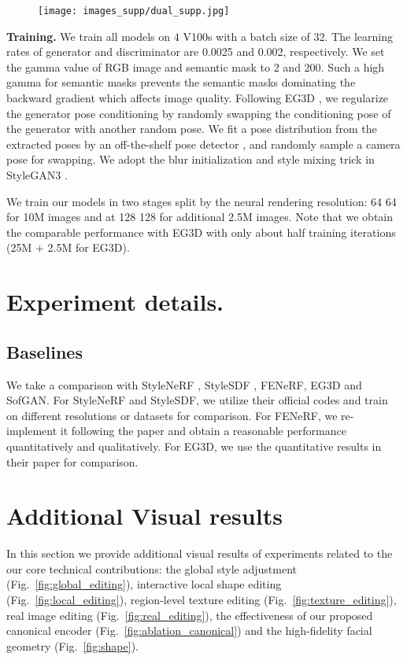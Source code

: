 \documentclass[acmtog]{acmart}
\begin{document}
\begin{figure}[b]
  \centering
  \texttt{[image: images\_supp/dual\_supp.jpg]}
  \caption{}
  \Description{}
  \label{fig:dual}
\end{figure}


\noindent \textbf{Training.} We train all models on 4 V100s with a batch size of 32. The learning rates of generator and discriminator are 0.0025 and 0.002, respectively. We set the gamma value of RGB image and semantic mask to 2 and 200. Such a high gamma for semantic masks prevents the semantic masks dominating the backward gradient which affects image quality. Following EG3D \cite{eg3d}, we regularize the generator pose conditioning by randomly swapping the conditioning pose of the generator with another random pose. We fit a pose distribution from the extracted poses by an off-the-shelf pose detector \cite{deng2019accurate}, and randomly sample a camera pose for swapping. We adopt the blur initialization and style mixing trick in StyleGAN3 \cite{karras2021alias}. 

We train our models in two stages split by the neural rendering resolution: 64  64 for 10M images and at 128  128 for additional 2.5M images. Note that we obtain the comparable performance with EG3D with only about half training iterations (25M + 2.5M for EG3D). 

\section{Experiment details.} 
\label{sec:2}

\subsection{Baselines}

We take a comparison with StyleNeRF \cite{gu2021stylenerf}, StyleSDF \cite{orel2021stylesdf}, FENeRF\cite{sun2021fenerf}, EG3D\cite{eg3d} and SofGAN\cite{chen2020sofgan}. For StyleNeRF and StyleSDF, we utilize their official codes and train on different resolutions or datasets for comparison. For FENeRF, we re-implement it following the paper and obtain a reasonable performance quantitatively and qualitatively. For EG3D,  we use the quantitative results in their paper for comparison. 

\section{Additional Visual results}
\label{sec:3}
In this section we provide additional visual results of experiments related to the our core technical contributions: the global style adjustment (Fig.~\ref{fig:global_editing}), interactive local shape editing (Fig.~\ref{fig:local_editing}), region-level texture editing (Fig.~\ref{fig:texture_editing}), real image editing (Fig.~\ref{fig:real_editing}), the effectiveness of our proposed canonical encoder (Fig.~\ref{fig:ablation_canonical}) and the high-fidelity facial geometry (Fig.~\ref{fig:shape}).
\end{document}

